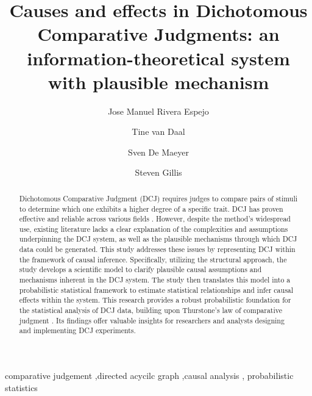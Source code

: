 \documentclass[
  authoryear,
  preprint,
  1p]{elsarticle}
\begin{document}
\begin{frontmatter}
\title{Causes and effects in Dichotomous Comparative Judgments: an
information-theoretical system with plausible mechanism}
\author[1]{Jose Manuel Rivera Espejo%
%
}
\author[1]{Tine van Daal%
%
}
\author[1]{Sven De Maeyer%
%
}
\author[2]{Steven Gillis%
%
}






        
\begin{abstract}
Dichotomous Comparative Judgment (DCJ) requires judges to compare pairs
of stimuli to determine which one exhibits a higher degree of a specific
trait. DCJ has proven effective and reliable across various fields
\citep{Pollitt_2012b, Jones_2015, vanDaal_et_al_2016, Bartholomew_et_al_2018, Lesterhuis_2018, Bartholomew_et_al_2020, Marshall_et_al_2020, Boonen_et_al_2020}.
However, despite the method's widespread use, existing literature lacks
a clear explanation of the complexities and assumptions underpinning the
DCJ system, as well as the plausible mechanisms through which DCJ data
could be generated. This study addresses these issues by representing
DCJ within the framework of causal inference. Specifically, utilizing
the structural approach, the study develops a scientific model to
clarify plausible causal assumptions and mechanisms inherent in the DCJ
system. The study then translates this model into a probabilistic
statistical framework to estimate statistical relationships and infer
causal effects within the system. This research provides a robust
probabilistic foundation for the statistical analysis of DCJ data,
building upon Thurstone's law of comparative judgment
\citeyearpar{Thurstone_1927}. Its findings offer valuable insights for
researchers and analysts designing and implementing DCJ experiments.
\end{abstract}





\begin{keyword}
    comparative judgement \sep directed acycilc graph \sep causal
analysis \sep 
    probabilistic statistics
\end{keyword}
\end{frontmatter}
    
\end{document}
